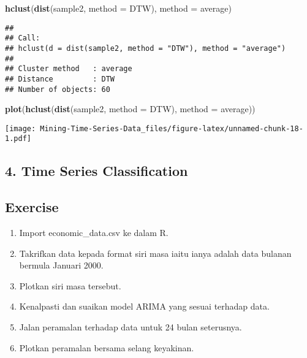 \documentclass[
]{article}
\newenvironment{Shaded}{\begin{snugshade}}{\end{snugshade}}
\newcommand{\AttributeTok}[1]{\textcolor[rgb]{0.13,0.29,0.53}{#1}}
\newcommand{\FunctionTok}[1]{\textcolor[rgb]{0.13,0.29,0.53}{\textbf{#1}}}
\newcommand{\NormalTok}[1]{#1}
\newcommand{\StringTok}[1]{\textcolor[rgb]{0.31,0.60,0.02}{#1}}
\providecommand{\tightlist}{%
  \setlength{\itemsep}{0pt}\setlength{\parskip}{0pt}}
\begin{document}
\begin{Shaded}
\begin{Highlighting}[]
\FunctionTok{hclust}\NormalTok{(}\FunctionTok{dist}\NormalTok{(sample2, }\AttributeTok{method =} \StringTok{\textquotesingle{}DTW\textquotesingle{}}\NormalTok{), }\AttributeTok{method =} \StringTok{\textquotesingle{}average\textquotesingle{}}\NormalTok{)}
\end{Highlighting}
\end{Shaded}

\begin{verbatim}
## 
## Call:
## hclust(d = dist(sample2, method = "DTW"), method = "average")
## 
## Cluster method   : average 
## Distance         : DTW 
## Number of objects: 60
\end{verbatim}

\begin{Shaded}
\begin{Highlighting}[]
\FunctionTok{plot}\NormalTok{(}\FunctionTok{hclust}\NormalTok{(}\FunctionTok{dist}\NormalTok{(sample2, }\AttributeTok{method =} \StringTok{\textquotesingle{}DTW\textquotesingle{}}\NormalTok{), }\AttributeTok{method =} \StringTok{\textquotesingle{}average\textquotesingle{}}\NormalTok{))}
\end{Highlighting}
\end{Shaded}

\texttt{[image: Mining-Time-Series-Data\_files/figure-latex/unnamed-chunk-18-1.pdf]}

\subsection{4. Time Series
Classification}\label{time-series-classification}

\subsection{Exercise}\label{exercise}

\begin{enumerate}
\def\labelenumi{\arabic{enumi}.}
\tightlist
\item
  Import economic\_data.csv ke dalam R.
\item
  Takrifkan data kepada format siri masa iaitu ianya adalah data bulanan
  bermula Januari 2000.
\item
  Plotkan siri masa tersebut.
\item
  Kenalpasti dan suaikan model ARIMA yang sesuai terhadap data.
\item
  Jalan peramalan terhadap data untuk 24 bulan seterusnya.
\item
  Plotkan peramalan bersama selang keyakinan.
\end{enumerate}
\end{document}

